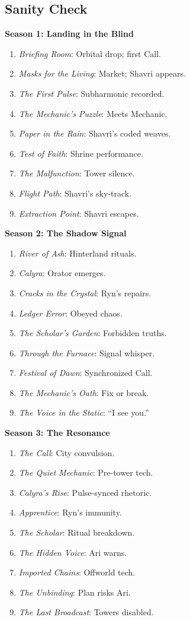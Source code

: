 \documentclass[10pt,letterpaper]{article}
\begin{document}
\begin{paracol}{2}
\subsection{Sanity Check}
\textbf{Season 1: Landing in the Blind}
\begin{enumerate}
    \item \textit{Briefing Room}: Orbital drop; first Call.
    \item \textit{Masks for the Living}: Market; Shavri appears.
    \item \textit{The First Pulse}: Subharmonic recorded.
    \item \textit{The Mechanic’s Puzzle}: Meets Mechanic.
    \item \textit{Paper in the Rain}: Shavri’s coded weaves.
    \item \textit{Test of Faith}: Shrine performance.
    \item \textit{The Malfunction}: Tower silence.
    \item \textit{Flight Path}: Shavri’s sky-track.
    \item \textit{Extraction Point}: Shavri escapes.
\end{enumerate}

\textbf{Season 2: The Shadow Signal}
\begin{enumerate}
    \item \textit{River of Ash}: Hinterland rituals.
    \item \textit{Calyra}: Orator emerges.
    \item \textit{Cracks in the Crystal}: Ryn’s repairs.
    \item \textit{Ledger Error}: Obeyed chaos.
    \item \textit{The Scholar’s Garden}: Forbidden truths.
    \item \textit{Through the Furnace}: Signal whisper.
    \item \textit{Festival of Dawn}: Synchronized Call.
    \item \textit{The Mechanic’s Oath}: Fix or break.
    \item \textit{The Voice in the Static}: “I see you.”
\end{enumerate}

\switchcolumn

\textbf{Season 3: The Resonance}
\begin{enumerate}
    \item \textit{The Call}: City convulsion.
    \item \textit{The Quiet Mechanic}: Pre-tower tech.
    \item \textit{Calyra’s Rise}: Pulse-synced rhetoric.
    \item \textit{Apprentice}: Ryn’s immunity.
    \item \textit{The Scholar}: Ritual breakdown.
    \item \textit{The Hidden Voice}: Ari warns.
    \item \textit{Imported Chains}: Offworld tech.
    \item \textit{The Unbinding}: Plan risks Ari.
    \item \textit{The Last Broadcast}: Towers disabled.
\end{enumerate}


\end{paracol}
\end{document}
